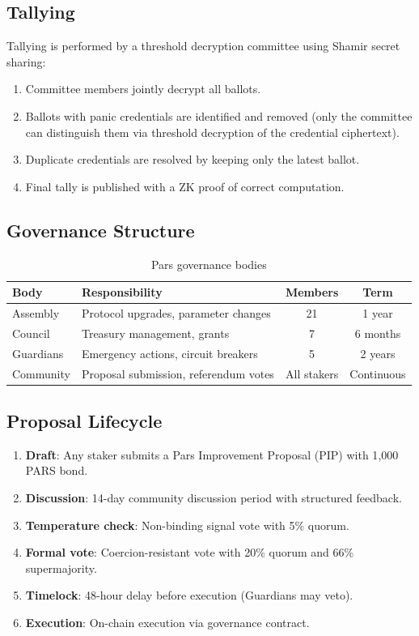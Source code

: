\documentclass[11pt,a4paper]{article}
\begin{document}
\subsection{Tallying}

Tallying is performed by a threshold decryption committee using Shamir secret sharing:

\begin{enumerate}
    \item Committee members jointly decrypt all ballots.
    \item Ballots with panic credentials are identified and removed (only the committee can distinguish them via threshold decryption of the credential ciphertext).
    \item Duplicate credentials are resolved by keeping only the latest ballot.
    \item Final tally is published with a ZK proof of correct computation.
\end{enumerate}

\subsection{Governance Structure}

\begin{table}[H]
\centering
\caption{Pars governance bodies}
\label{tab:governance}
\begin{tabularx}{\textwidth}{lXcc}
\toprule
\textbf{Body} & \textbf{Responsibility} & \textbf{Members} & \textbf{Term} \\
\midrule
Assembly & Protocol upgrades, parameter changes & 21 & 1 year \\
Council & Treasury management, grants & 7 & 6 months \\
Guardians & Emergency actions, circuit breakers & 5 & 2 years \\
Community & Proposal submission, referendum votes & All stakers & Continuous \\
\bottomrule
\end{tabularx}
\end{table}

\subsection{Proposal Lifecycle}

\begin{enumerate}
    \item \textbf{Draft}: Any staker submits a Pars Improvement Proposal (PIP) with 1{,}000 PARS bond.
    \item \textbf{Discussion}: 14-day community discussion period with structured feedback.
    \item \textbf{Temperature check}: Non-binding signal vote with 5\% quorum.
    \item \textbf{Formal vote}: Coercion-resistant vote with 20\% quorum and 66\% supermajority.
    \item \textbf{Timelock}: 48-hour delay before execution (Guardians may veto).
    \item \textbf{Execution}: On-chain execution via governance contract.
\end{enumerate}
\end{document}
